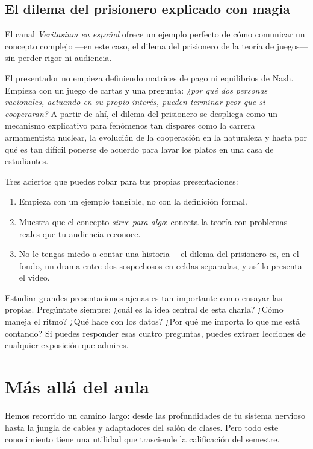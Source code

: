 \subsection*{El dilema del prisionero explicado con magia}

El canal \emph{Veritasium en español} ofrece un ejemplo perfecto de cómo comunicar un concepto complejo —en este caso, el dilema del prisionero de la teoría de juegos— sin perder rigor ni audiencia.

El presentador no empieza definiendo matrices de pago ni equilibrios de Nash.
Empieza con un juego de cartas y una pregunta: \emph{¿por qué dos personas racionales, actuando en su propio interés, pueden terminar peor que si cooperaran?}
A partir de ahí, el dilema del prisionero se despliega como un mecanismo explicativo para fenómenos tan dispares como la carrera armamentista nuclear, la evolución de la cooperación en la naturaleza y hasta por qué es tan difícil ponerse de acuerdo para lavar los platos en una casa de estudiantes.

Tres aciertos que puedes robar para tus propias presentaciones: \begin{enumerate}
	\item Empieza con un ejemplo tangible, no con la definición formal.
	\item Muestra que el concepto \emph{sirve para algo}: conecta la teoría con problemas reales que tu audiencia reconoce.
	\item No le tengas miedo a contar una historia —el dilema del prisionero es, en el fondo, un drama entre dos sospechosos en celdas separadas, y así lo presenta el video.
\end{enumerate}

\begin{remember}
	\label{rem:referentes}
	Estudiar grandes presentaciones ajenas es tan importante como ensayar las propias.
	Pregúntate siempre: ¿cuál es la idea central de esta charla?
	¿Cómo maneja el ritmo?
	¿Qué hace con los datos?
	¿Por qué me importa lo que me está contando?
	Si puedes responder esas cuatro preguntas, puedes extraer lecciones de cualquier exposición que admires.
\end{remember}

\section{Más allá del aula}
\label{sec:masalladelaula}

Hemos recorrido un camino largo: desde las profundidades de tu sistema nervioso hasta la jungla de cables y adaptadores del salón de clases.
Pero todo este conocimiento tiene una utilidad que trasciende la calificación del semestre.

